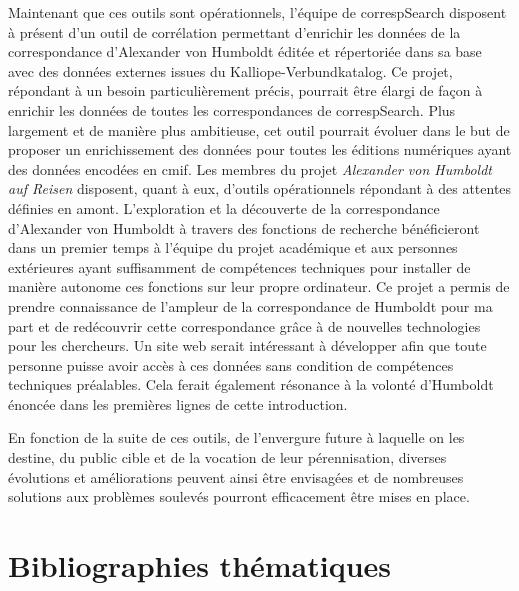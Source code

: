 \documentclass[a4paper, 12pt, twoside]{book}
\begin{document}
Maintenant que ces outils sont opérationnels, l'équipe de correspSearch disposent à présent d'un outil de corrélation permettant d'enrichir les données de la correspondance d'Alexander von Humboldt éditée et répertoriée dans sa base avec des données externes issues du Kalliope-Verbundkatalog. Ce projet, répondant à un besoin particulièrement précis, pourrait être élargi de façon à enrichir les données de toutes les correspondances de correspSearch. Plus largement et de manière plus ambitieuse, cet outil pourrait évoluer dans le but de proposer un enrichissement des données pour toutes les éditions numériques ayant des données encodées en \gls{cmif}. Les membres du projet \textit{Alexander von Humboldt auf Reisen} disposent, quant à eux, d'outils opérationnels répondant à des attentes définies en amont. L'exploration et la découverte de la correspondance d'Alexander von Humboldt à travers des fonctions de recherche bénéficieront dans un premier temps à l'équipe du projet académique et aux personnes extérieures ayant suffisamment de compétences techniques pour installer de manière autonome ces fonctions sur leur propre ordinateur. Ce projet a permis de prendre connaissance de l'ampleur de la correspondance de Humboldt pour ma part et de redécouvrir cette correspondance grâce à de nouvelles technologies pour les chercheurs. Un site web serait intéressant à développer afin que toute personne puisse avoir accès à ces données sans condition de compétences techniques préalables. Cela ferait également résonance à la volonté d'Humboldt énoncée dans les premières lignes de cette introduction. 

 

En fonction de la suite de ces outils, de l'envergure future à laquelle on les destine, du public cible et de la vocation de leur pérennisation, diverses évolutions et améliorations peuvent ainsi être envisagées et de nombreuses solutions aux problèmes soulevés pourront efficacement être mises en place. 


\part*{Bibliographies thématiques}
\printbibliography[keyword={humanities},title={Sur les humanités numériques}]
\printbibliography[keyword={data},title={Sur les données et visualisations de données}]
\printbibliography[keyword={bbaw},title={Sur les projets de la BBAW}]
\printbibliography[keyword={humboldt},title={Sur Alexander von Humboldt}]
\end{document}
